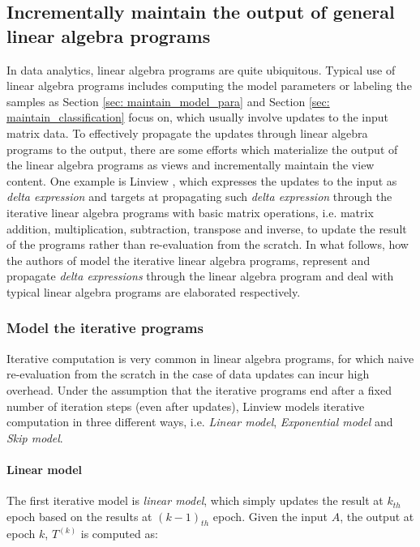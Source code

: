 \subsection{Incrementally maintain the output of general linear algebra programs}
In data analytics, linear algebra programs are quite ubiquitous. Typical use of linear algebra programs includes computing the model parameters or labeling the samples as Section \ref{sec: maintain_model_para} and Section \ref{sec: maintain_classification} focus on, which usually involve updates to the input matrix data. To effectively propagate the updates through linear algebra programs to the output, there are some efforts which materialize the output of the linear algebra programs as views and incrementally maintain the view content. One example is Linview \cite{nikolic2014linview}, which expresses the updates to the input as {\em delta expression} and targets at propagating such {\em delta expression} through the iterative linear algebra programs with basic matrix operations, i.e. matrix addition, multiplication, subtraction, transpose and inverse, to update the result of the programs rather than re-evaluation from the scratch. In what follows, how the authors of \cite{nikolic2014linview} model the iterative linear algebra programs, represent and propagate {\em delta expressions} through the linear algebra program and deal with typical linear algebra programs are elaborated respectively.

\subsubsection{Model the iterative programs}\label{sec: iterative_model}
Iterative computation is very common in linear algebra programs, for which naive re-evaluation from the scratch in the case of data updates can incur high overhead. Under the assumption that the iterative programs end after a fixed number of iteration steps (even after updates), Linview models iterative computation in three different ways, i.e. {\em Linear model}, {\em Exponential model} and {\em Skip model}.

\paragraph{Linear model} The first iterative model is {\em linear model}, which simply updates the result at $k_{th}$ epoch based on the results at $(k-1)_{th}$ epoch. Given the input $A$, the output at epoch $k$, $T^{(k)}$ is computed as:

